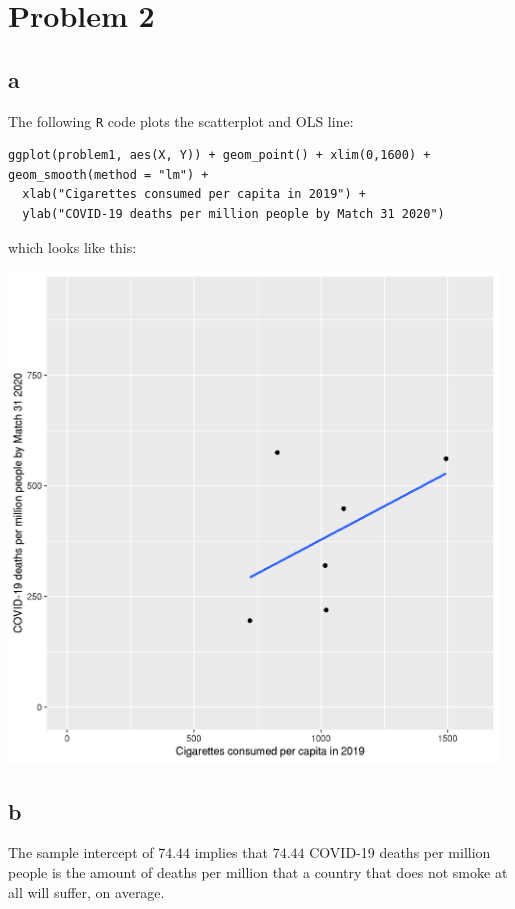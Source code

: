 \documentclass[12pt,letterpaper]{article}
\theoremstyle{definition}
\begin{document}
\section*{Problem 2}
\subsection*{a}
The following \verb|R| code plots the scatterplot and OLS line:
\begin{Verbatim}[fontsize=\small]
ggplot(problem1, aes(X, Y)) + geom_point() + xlim(0,1600) + geom_smooth(method = "lm") +
  xlab("Cigarettes consumed per capita in 2019") +
  ylab("COVID-19 deaths per million people by Match 31 2020")
\end{Verbatim}
which looks like this:
\begin{center}
  \includegraphics[width=13cm]{./problem2.png}
\end{center}

\subsection*{b}


The sample intercept of \(74.44\) implies that \(74.44\) COVID-19 deaths per million people is the amount of deaths per million that a country that does not smoke at all will suffer, on average.
\end{document}
